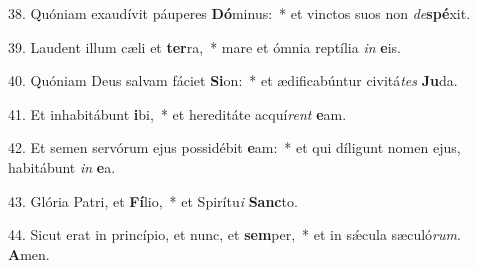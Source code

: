 38. Quóniam exaudívit páuperes \textbf{Dó}minus:~*  et vinctos suos non \textit{de}\textbf{spé}xit.\

39. Laudent illum cæli et \textbf{ter}ra,~*  mare et ómnia reptília \textit{in} \textbf{e}is.\

40. Quóniam Deus salvam fáciet \textbf{Si}on:~*  et ædificabúntur civitá\textit{tes} \textbf{Ju}da.\

41. Et inhabitábunt \textbf{i}bi,~*  et hereditáte acquí\textit{rent} \textbf{e}am.\

42. Et semen servórum ejus possidébit \textbf{e}am:~*  et qui díligunt nomen ejus, habitábunt \textit{in} \textbf{e}a.\

43. Glória Patri, et \textbf{Fí}lio,~*  et Spirítu\textit{i} \textbf{Sanc}to.\

44. Sicut erat in princípio, et nunc, et \textbf{sem}per,~*  et in sǽcula sæculó\textit{rum}. \textbf{A}men.\

